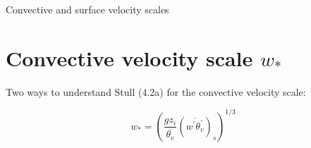 \documentclass[12pt]{article}
\begin{document}
\pagestyle{first}

\begin{center}
Convective and surface velocity scales\\
\end{center}

\section{Convective velocity scale $w_*$}
\label{sec:recap}

Two ways to understand Stull (4.2a) for the convective velocity scale:

\begin{equation}
  \label{eq:wstar}
  w_* = \left (  \frac{ g z_i}{\overline{ \theta_v}} \left (  \overline{ w^\prime \theta_v^\prime } \right )_s \right )^{1/3}
\end{equation}
\end{document}
